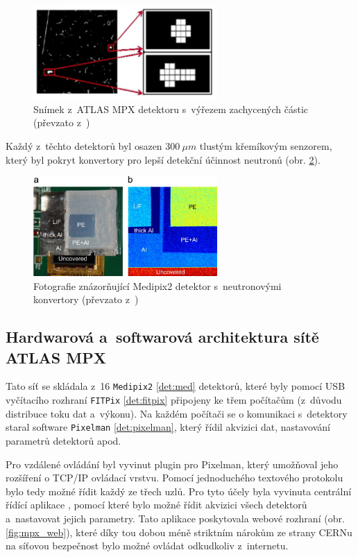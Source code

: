 \begin{figure}[ht]
	\begin{center}
		\includegraphics[width=7cm]{figures/mpx_cluster.png}
		\caption{Snímek z~ATLAS MPX detektoru s~výřezem zachycených částic (převzato z~\cite{atlasmpx})}
		\label{fig:mpx_cluster}
	\end{center}
\end{figure}


Každý z~těchto detektorů byl osazen $300~\mu m$ tlustým křemíkovým senzorem, který byl pokryt konvertory pro lepší detekční účinnost neutronů (obr. \ref{fig:mpx_lay}).

\begin{figure}[ht]
	\begin{center}
		\includegraphics[width=7cm]{figures/mpx-layers.jpg}
		\caption{Fotografie znázorňující Medipix2 detektor s~neutronovými konvertory (převzato z~\cite{Vykydal200935})}
		\label{fig:mpx_lay}
	\end{center}
\end{figure}

\subsection{Hardwarová a~softwarová architektura sítě ATLAS MPX}
Tato síť se skládala z~16 \texttt{Medipix2} \ref{det:med} detektorů, které byly pomocí USB vyčítacího rozhraní \texttt{FITPix} \ref{det:fitpix} připojeny ke třem počítačům (z~důvodu distribuce toku dat a~výkonu). Na každém počítači se o komunikaci s~detektory staral software \texttt{Pixelman} \ref{det:pixelman}, který řídil akvizici dat, nastavování parametrů detektorů apod. 

Pro vzdálené ovládání byl vyvinut plugin pro Pixelman, který umožňoval jeho rozšíření o TCP/IP ovládací vrstvu. Pomocí jednoduchého textového protokolu bylo tedy možné řídit každý ze třech uzlů. Pro tyto účely byla vyvinuta centrální řídící aplikace \cite{Turecek2011S45}, pomocí které bylo možné řídit akvizici všech detektorů a~nastavovat jejich parametry. Tato aplikace poskytovala webové rozhraní (obr. \ref{fig:mpx_web}), které díky tou dobou méně 
striktním nárokům ze strany CERNu na síťovou bezpečnost bylo možné ovládat odkudkoliv z~internetu.

